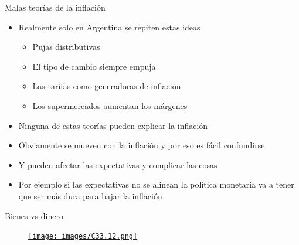 \documentclass{beamer}
\begin{document}






\begin{frame}{Malas teorías de la inflación}

    \begin{itemize}
        \item Realmente solo en Argentina se repiten estas ideas
            \begin{itemize}
        \item Pujas distributivas
        \item El tipo de cambio siempre empuja
        \item Las tarifas como generadoras de inflación
        \item Los supermercados aumentan los márgenes
            \end{itemize}
        \item Ninguna de estas teorías pueden explicar la inflación
        \item Obviamente se mueven con la inflación y por eso es fácil confundirse 
        \item Y pueden afectar las expectativas y complicar las cosas
        \item Por ejemplo si las expectativas no se alinean la política monetaria va a tener que ser más dura para bajar la inflación

    \end{itemize}

\end{frame}




\begin{frame}{Bienes vs dinero}
    \begin{figure}
    \centering
    \href{https://twitter.com/ergasto/status/1428400472562573318?s=24}{
    \texttt{[image: images/C33.12.png]}}
\end{figure}
\end{frame}


\end{document}
